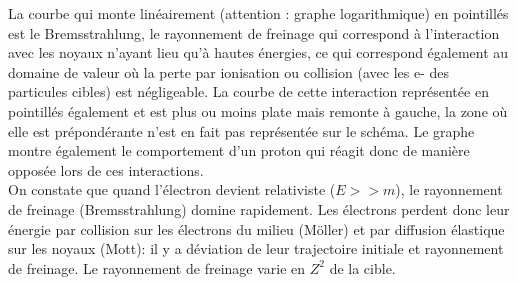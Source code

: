 La courbe qui monte linéairement (attention : graphe logarithmique) en pointillés est le Bremsstrahlung, le rayonnement de freinage qui correspond à l'interaction avec les noyaux n'ayant lieu qu'à hautes énergies, ce qui correspond également au domaine de valeur où la perte par ionisation ou collision (avec les e- des particules cibles) est négligeable. La courbe de cette interaction représentée en pointillés également et est plus ou moins plate mais remonte à gauche, la zone où elle est prépondérante n'est en fait pas représentée sur le schéma. Le graphe montre également le comportement d'un proton qui réagit donc de manière opposée lors de ces interactions.\\
On constate que quand l'électron devient relativiste ($E>>m$), le rayonnement de freinage (Bremsstrahlung) domine rapidement. Les électrons perdent donc leur énergie par collision sur les électrons du milieu (Möller) et par diffusion élastique sur les noyaux (Mott): il y a déviation de leur trajectoire initiale et rayonnement de freinage. Le rayonnement de freinage varie en $Z^2$ de la cible.

